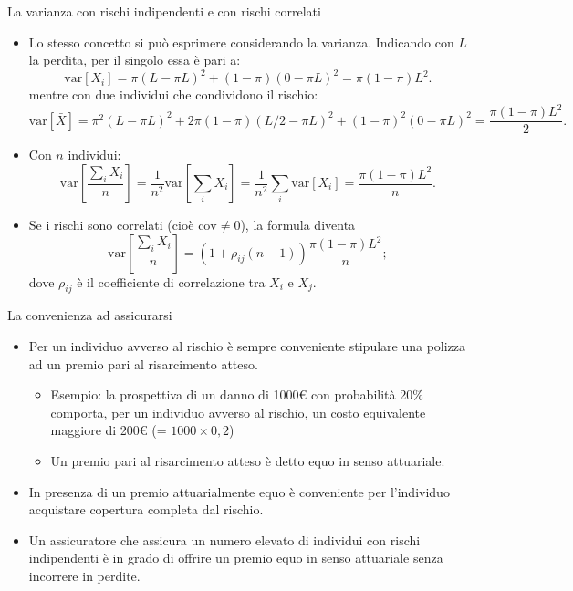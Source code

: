 \documentclass[aspectratio=64,12pt]{beamer}
\begin{document}
\begin{frame}{La varianza con rischi indipendenti e con rischi correlati}
\begin{itemize}
\item Lo stesso concetto si può esprimere considerando la varianza. Indicando con
$L$ la perdita, per il singolo essa è pari a:
\begin{equation*}
  \text{var}[X_i]=\pi(L-\pi L)^2+(1-\pi)(0-\pi L)^2 =\pi(1-\pi)L^2.
\end{equation*}
mentre con due individui che condividono il rischio:
\begin{equation*}
\text{var}[\bar{X}] = \pi^2(L-\pi L)^2+2\pi(1-\pi)\left(L/2-\pi L\right)^2
+(1-\pi)^2(0-\pi L)^2=\frac{\pi(1-\pi)L^2}{2}.
\end{equation*}
\item Con $n$ individui:
\begin{equation*}
  \text{var}\left[\frac{\sum_iX_i}{n}\right]
  =\frac{1}{n^2}\text{var}\left[\sum_iX_i\right]
  =\frac{1}{n^2}\sum_i\text{var}[X_i]=\frac{\pi(1-\pi)L^2}{n}.
\end{equation*}
\item Se i rischi sono correlati (cioè $\text{cov}\not=0$), la formula diventa
\begin{equation*}
\text{var}\left[\frac{\sum_iX_i}{n}\right]
=(1+\rho_{ij}(n-1))\frac{\pi(1-\pi)L^2}{n};
\end{equation*}
dove $\rho_{ij}$ è il coefficiente di correlazione tra $X_i$ e $X_j$.
\end{itemize}
\end{frame}

\begin{frame}{La convenienza ad assicurarsi}
\begin{itemize}
\item Per un individuo avverso al rischio è sempre conveniente stipulare una polizza ad un
premio pari al risarcimento atteso.
\begin{itemize}
\item Esempio: la prospettiva di un danno di 1000€ con probabilità 20\% comporta, per
un individuo avverso al rischio, un costo equivalente \alert{maggiore} di 200€
(= $1000\times 0,2$)
\item Un premio pari al risarcimento atteso è detto \alert{equo in senso attuariale}.
\end{itemize}
\item In presenza di un premio attuarialmente equo è conveniente per l'individuo
acquistare copertura completa dal rischio.
\item Un assicuratore che assicura un numero elevato di individui con rischi
indipendenti è in grado di offrire un premio equo in senso attuariale
senza incorrere in perdite.
\end{itemize}
\end{frame}
\end{document}
